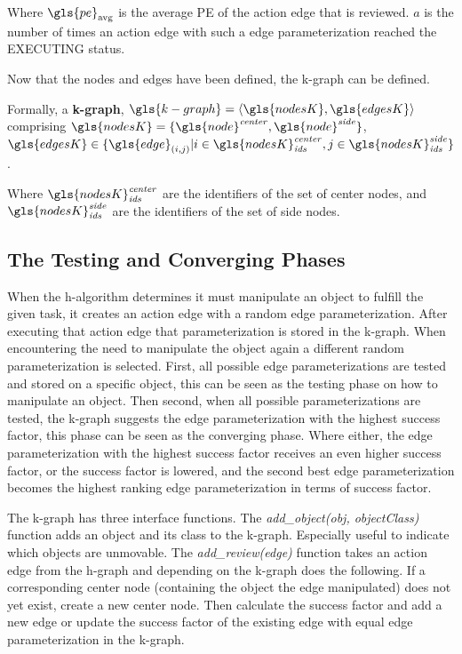 Where $\gls{pe}_\textrm{avg}$ is the average \ac{PE} of the action edge that is reviewed. $a$ is the number of times an action edge with such a edge parameterization reached the EXECUTING status.\bs

\noindent Now that the nodes and edges have been defined, the \ac{k-graph} can be defined.\bs

Formally, a \textbf{\acl{k-graph}}, $\gls{k-graph} = \left\langle \gls{nodesK}, \gls{edgesK} \right\rangle $
\\comprising $\gls{nodesK} = \{\gls{node}^{\mathit{center}}, \gls{node}^{\mathit{side}}\}$, \quad $\gls{edgesK} \in \{\gls{edge}_{(i,j)}| i \in \gls{nodesK}^\mathit{center}_\mathit{ids}, j \in \gls{nodesK}^\mathit{side}_\mathit{ids} \}$.\bs

Where $\gls{nodesK}^\mathit{center}_\mathit{ids}$ are the identifiers of the set of center nodes, and $\gls{nodesK}^\mathit{side}_\mathit{ids}$ are the identifiers of the set of side nodes.\bs

\subsection{The Testing and Converging Phases}
When the \ac{h-algorithm} determines it must manipulate an object to fulfill the given task, it creates an action edge with a random edge parameterization. After executing that action edge that parameterization is stored in the \ac{k-graph}. When encountering the need to manipulate the object again a different random parameterization is selected. First, all possible edge parameterizations are tested and stored on a specific object, this can be seen as the testing phase on how to manipulate an object. Then second, when all possible parameterizations are tested, the \ac{k-graph} suggests the edge parameterization with the highest success factor, this phase can be seen as the converging phase. Where either, the edge parameterization with the highest success factor receives an even higher success factor, or the success factor is lowered, and the second best edge parameterization becomes the highest ranking edge parameterization in terms of success factor.\bs

The \ac{k-graph} has three interface functions. The \textit{add\_object(\gls{obj}, \gls{objectClass})} function adds an object and its class to the \ac{k-graph}. Especially useful to indicate which objects are unmovable. The \textit{add\_review(\gls{edge})} function takes an action edge from the \ac{h-graph} and depending on the \ac{k-graph} does the following. If a corresponding center node (containing the object the edge manipulated) does not yet exist, create a new center node. Then calculate the success factor and add a new edge or update the success factor of the existing edge with equal edge parameterization in the \ac{k-graph}.  

